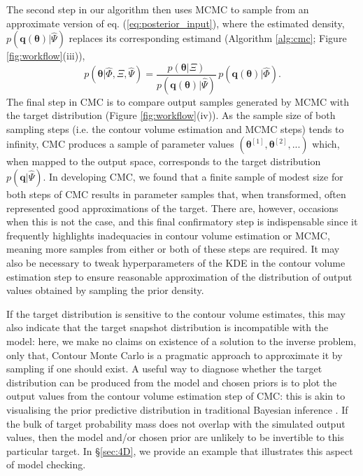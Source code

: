 The second step in our algorithm then uses MCMC to sample from an approximate version of eq. (\ref{eq:posterior_input}), where the estimated density, $p(\boldsymbol{q}(\boldsymbol{\theta})|\hat{\Psi})$ replaces its corresponding estimand (Algorithm \ref{alg:cmc}; Figure \ref{fig:workflow}(iii)),
%
\begin{equation}\label{eq:posterior_input_estimated}
p(\boldsymbol{\theta}|\hat{\Phi},\Xi,\hat{\Psi}) =
\frac{p(\boldsymbol{\theta}|\Xi)}{p(\boldsymbol{q}(\boldsymbol{\theta})|\hat{\Psi})} \,
p(\boldsymbol{q}(\boldsymbol{\theta})|\hat{\Phi}).
\end{equation}
%
The final step in CMC is to compare output samples generated by MCMC with the target distribution (Figure \ref{fig:workflow}(iv)). As the sample size of both sampling steps (i.e. the contour volume estimation and MCMC steps) tends to infinity, CMC produces a sample of parameter values $(\boldsymbol{\theta}^{[1]},\boldsymbol{\theta}^{[2]},...)$ which, when mapped to the output space, corresponds to the target distribution $p(\boldsymbol{q}|\hat{\Psi})$. In developing CMC, we found that a finite sample of modest size for both steps of CMC results in parameter samples that, when transformed, often represented good approximations of the target. There are, however, occasions when this is not the case, and this final confirmatory step is indispensable since it frequently highlights inadequacies in contour volume estimation or MCMC, meaning more samples from either or both of these steps are required. It may also be necessary to tweak hyperparameters of the KDE in the contour volume estimation step to ensure reasonable approximation of the distribution of output values obtained by sampling the prior density.

If the target distribution is sensitive to the contour volume estimates, this may also indicate that the target snapshot distribution is incompatible with the model: here, we make no claims on existence of a solution to the inverse problem, only that, Contour Monte Carlo is a pragmatic approach to approximate it by sampling if one should exist. A useful way to diagnose whether the target distribution can be produced from the model and chosen priors is to plot the output values from the contour volume estimation step of CMC: this is akin to visualising the prior predictive distribution in traditional Bayesian inference \cite{lambert2018Student}. If the bulk of target probability mass does not overlap with the simulated output values, then the model and/or chosen prior are unlikely to be invertible to this particular target. In \S\ref{sec:4D}, we provide an example that illustrates this aspect of model checking.

